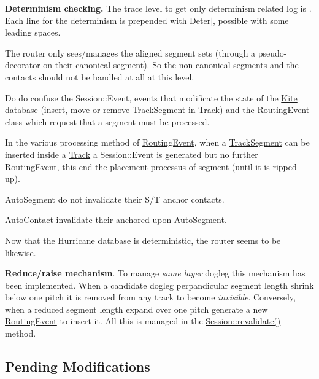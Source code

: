 \begin{DoxyItemize}
\item {\bfseries Determinism checking.} The trace level to get only determinism related log is {}. Each line for the determinism is prepended with \textquotesingle{}Deter$\vert$\textquotesingle{}, possible with some leading spaces.
\item The router only sees/manages the aligned segment sets (through a pseudo-\/ decorator on their canonical segment). So the non-\/canonical segments and the contacts should not be handled at all at this level.
\item Do do confuse the Session\+::\+Event, events that modificate the state of the \mbox{\hyperlink{namespaceKite}{Kite}} database (insert, move or remove \mbox{\hyperlink{classKite_1_1TrackSegment}{Track\+Segment}} in \mbox{\hyperlink{classKite_1_1Track}{Track}}) and the \mbox{\hyperlink{classKite_1_1RoutingEvent}{Routing\+Event}} class which request that a segment must be processed.
\item In the various processing method of \mbox{\hyperlink{classKite_1_1RoutingEvent}{Routing\+Event}}, when a \mbox{\hyperlink{classKite_1_1TrackSegment}{Track\+Segment}} can be inserted inside a \mbox{\hyperlink{classKite_1_1Track}{Track}} a Session\+::\+Event is generated but no further \mbox{\hyperlink{classKite_1_1RoutingEvent}{Routing\+Event}}, this end the placement processus of segment (until it is ripped-\/up).
\item Auto\+Segment do not invalidate their S/T anchor contacts.
\item Auto\+Contact invalidate their anchored upon Auto\+Segment.
\item Now that the Hurricane database is deterministic, the router seems to be likewise.
\item {\bfseries Reduce/raise mechanism}. To manage {\itshape same layer} dogleg this mechanism has been implemented. When a candidate dogleg perpandicular segment length shrink below one pitch it is removed from any track to become {\itshape invisible}. Conversely, when a reduced segment length expand over one pitch generate a new \mbox{\hyperlink{classKite_1_1RoutingEvent}{Routing\+Event}} to insert it. All this is managed in the \mbox{\hyperlink{classKite_1_1Session_a5bd93abe1416952ace15a98dbeeed124}{Session\+::revalidate()}} method.
\end{DoxyItemize}\hypertarget{pageNotes_secPendingModifications}{}\subsection{Pending Modifications}\label{pageNotes_secPendingModifications}

